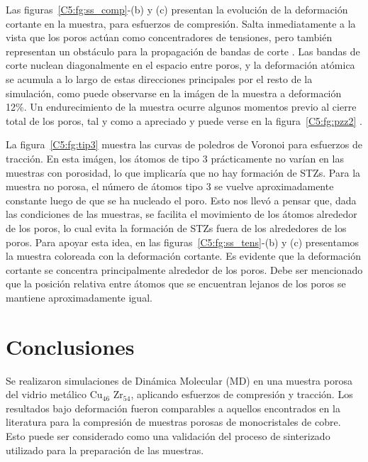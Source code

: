 Las figuras~\ref{C5:fg:ss_comp}-(b) y (c) presentan la evolución de la deformación cortante en la muestra, para esfuerzos de compresión.
Salta inmediatamente a la vista que los poros actúan como concentradores de tensiones, pero también representan un obstáculo para la
propagación de bandas de corte \citep{wang10}. Las bandas de corte nuclean diagonalmente en el espacio entre poros, y la deformación atómica
se acumula a lo largo de estas direcciones principales por el resto de la simulación, como puede observarse en la imágen de la muestra a 
deformación 12\%. Un endurecimiento de la muestra ocurre algunos momentos previo al cierre total de los poros, tal y como a apreciado
\cite{yuan14} y puede verse en la figura~\ref{C5:fg:pzz2} .

La figura~\ref{C5:fg:tip3}  muestra las curvas de poledros de Voronoi para esfuerzos de tracción. En esta imágen, los átomos de tipo 3
prácticamente no varían en las muestras con porosidad, lo que implicaría que no hay formación de STZs.
Para la muestra no porosa, el número de átomos tipo 3 se vuelve aproximadamente constante luego de que se ha nucleado el poro. Esto
nos llevó a pensar que, dada las condiciones de las muestras, se facilita el movimiento de los átomos alrededor de los poros, lo cual evita
la formación de STZs fuera de los alrededores de los poros. Para apoyar esta idea, en las figuras~\ref{C5:fg:ss_tens}-(b) y (c) presentamos
la muestra coloreada con la deformación cortante. Es evidente que la deformación cortante se concentra principalmente alrededor
de los poros. Debe ser mencionado que la posición relativa entre átomos que se encuentran lejanos de los poros se mantiene aproximadamente igual.



\section{Conclusiones}
\label{S5_4}

Se realizaron simulaciones de Dinámica Molecular (MD) en una muestra porosa del vidrio metálico Cu$_{46}$ Zr$_{54}$, aplicando esfuerzos
de compresión y tracción. Los resultados bajo deformación fueron comparables a aquellos encontrados en la literatura \citep{yuan14} para
la compresión de muestras porosas de monocristales de cobre. Esto puede ser considerado como una validación del proceso de sinterizado 
utilizado para la preparación de las muestras.

